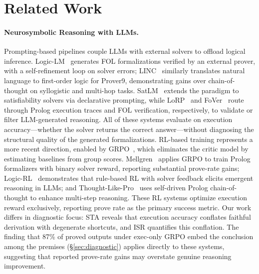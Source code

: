 \section{Related Work}
\label{sec:related-work}

\paragraph{Neurosymbolic Reasoning with LLMs.}
Prompting-based pipelines couple LLMs with external solvers to offload logical inference.
Logic-LM~\cite{logic-lm} generates FOL formalizations verified by an external prover, with a self-refinement loop on solver errors; LINC~\cite{linc} similarly translates natural language to first-order logic for Prover9, demonstrating gains over chain-of-thought on syllogistic and multi-hop tasks.
SatLM~\cite{satlm} extends the paradigm to satisfiability solvers via declarative prompting, while LoRP~\cite{lorp} and FoVer~\cite{fover-pei2025} route through Prolog execution traces and FOL verification, respectively, to validate or filter LLM-generated reasoning.
All of these systems evaluate on execution accuracy---whether the solver returns the correct answer---without diagnosing the structural quality of the generated formalizations.
RL-based training represents a more recent direction, enabled by GRPO~\cite{deepseekmath}, which eliminates the critic model by estimating baselines from group scores.
Mellgren~\cite{mellgren-prolog-grpo} applies GRPO to train Prolog formalizers with binary solver reward, reporting substantial prove-rate gains; Logic-RL~\cite{logic-rl} demonstrates that rule-based RL with solver feedback elicits emergent reasoning in LLMs; and Thought-Like-Pro~\cite{thought-like-pro} uses self-driven Prolog chain-of-thought to enhance multi-step reasoning.
These RL systems optimize execution reward exclusively, reporting prove rate as the primary success metric.
Our work differs in diagnostic focus: STA reveals that execution accuracy conflates faithful derivation with degenerate shortcuts, and ISR quantifies this conflation.
The finding that 87\% of proved outputs under exec-only GRPO embed the conclusion among the premises (\S\ref{sec:diagnostic}) applies directly to these systems, suggesting that reported prove-rate gains may overstate genuine reasoning improvement.

